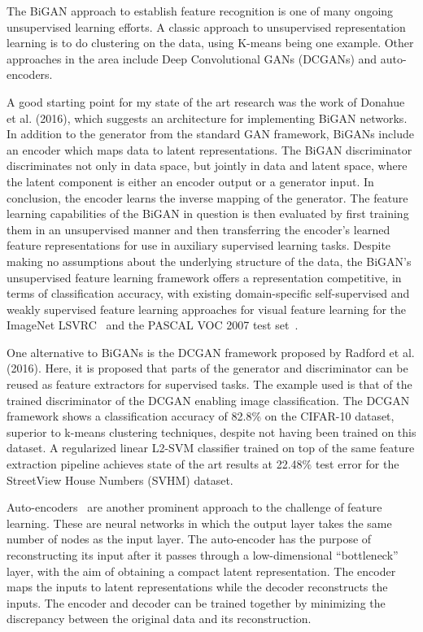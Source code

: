 \documentclass[]{monthly-report}
\begin{document}
The BiGAN approach to establish feature recognition is one of many ongoing unsupervised learning efforts. A classic approach to unsupervised representation learning is to do clustering on the data, using K-means being one example. Other approaches in the area include Deep Convolutional GANs (DCGANs) and auto-encoders. 

A good starting point for my state of the art research was the work of Donahue et al. (2016), which suggests an architecture for implementing BiGAN networks. In addition to the generator from the standard GAN framework, BiGANs include an encoder which maps data to latent representations. The BiGAN discriminator discriminates not only in data space, but jointly in data and latent space, where the latent component is either an encoder output or a generator input. In conclusion, the encoder learns the inverse mapping of the generator. The feature learning capabilities of the BiGAN in question is then evaluated by first training them in an unsupervised manner and then transferring the encoder’s learned feature representations for use in auxiliary supervised learning tasks. Despite making no assumptions about the underlying structure of the data, the BiGAN's unsupervised feature learning framework offers a representation competitive, in terms of classification accuracy, with existing domain-specific self-supervised and weakly supervised feature learning approaches for visual feature learning for the ImageNet LSVRC~\cite{russakovsky2014imagenet} and the PASCAL VOC 2007 test set~\cite{everingham2015pascal}.

One alternative to BiGANs is the DCGAN framework proposed by Radford et al. (2016). Here, it is proposed that parts of the generator and discriminator can be reused as feature extractors for supervised tasks. The example used is that of the trained discriminator of the DCGAN enabling image classification. The DCGAN framework shows a classification accuracy of 82.8\% on the CIFAR-10 dataset, superior to k-means clustering techniques, despite not having been trained on this dataset. A regularized linear L2-SVM classifier trained on top of the same feature extraction pipeline achieves state of the art results at 22.48\% test error for the StreetView House Numbers (SVHM) dataset. 

Auto-encoders~\cite{hinton2006reducing} are another prominent approach to the challenge of feature learning. These are neural networks in which the output layer takes the same number of nodes as the input layer. The auto-encoder has the purpose of reconstructing its input after it passes through a low-dimensional “bottleneck” layer, with the aim of obtaining a compact latent representation. The encoder maps the inputs to latent representations while the decoder reconstructs the inputs. The encoder and decoder can be trained together by minimizing the discrepancy between the original data and its reconstruction.
\end{document}
